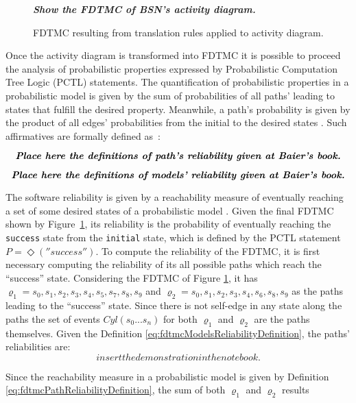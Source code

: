 \begin{figure}[h!]
\centering
\textit{\textbf{Show the FDTMC of BSN's activity diagram.}}
\label{fig:bsnActivityDiagramFDTMC}
\caption {FDTMC resulting from translation rules applied to activity diagram.}
\end{figure}


Once the activity diagram is transformed into FDTMC it is possible to proceed
the analysis of probabilistic properties expressed by Probabilistic Computation
Tree Logic (PCTL) statements. The quantification of probabilistic properties in
a probabilistic model is given by the sum of probabilities of all paths' leading
to states that fulfill the desired property. Meanwhile, a path's probability is
given by the product of all edges' probabilities from the initial to the desired
states \cite{baier_principles_2008}. Such affirmatives are formally defined as~\cite{baier_principles_2008}: 


\[\label{eq:fdtmcPathReliabilityDefinition}
\textit{\textbf{Place here the definitions of path's reliability given
at Baier's book.}}
\]

\[\label{eq:fdtmcModelsReliabilityDefinition}
\textit{\textbf{Place here the definitions of models' reliability given at
Baier's book.}}
\]


The software reliability is given by a reachability measure of eventually
reaching a set of some desired states of a probabilistic model
\cite{grunske_specification_2008}. Given the final FDTMC shown by
Figure~\ref{fig:bsnActivityDiagramFDTMC}, its reliability is the probability of
eventually reaching the \texttt{success} state from the \texttt{initial} state, which
is defined by the PCTL statement $P=\Diamond(''success'')$. To compute the
reliability of the FDTMC, it is first necessary computing the reliability of its
all possible paths which reach the ``success'' state. Considering the FDTMC of
Figure \ref{fig:bsnActivityDiagramFDTMC}, it has $\varrho_1 = s_0, s_1, s_2,
s_3, s_4, s_5, s_7, s_8, s_9$ and $\varrho_2 = s_0, s_1, s_2, s_3, s_4, s_6,
s_8, s_9$ as the paths leading to the ``success'' state. Since there is not
self-edge in any state along the paths the set of events $Cyl(s_0...s_n)$ for
both $\varrho_1$ and $\varrho_2$ are the paths themselves. Given the Definition
\ref{eq:fdtmcModelsReliabilityDefinition}, the paths' reliabilities are: 
\[
insert the demonstration in the notebook.
\]

Since the reachability measure in a probabilistic model is given by Definition
\ref{eq:fdtmcPathReliabilityDefinition}, the sum of both
$\varrho_1$ and $\varrho_2$ results

